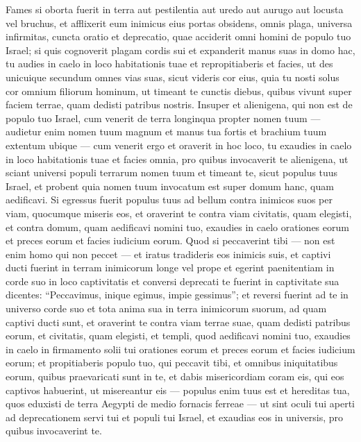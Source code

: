 \begin{biblechapter}
\begin{biblechapter}
\begin{biblechapter}
\begin{biblechapter}
\begin{biblechapter}
\begin{biblechapter}
\begin{biblechapter}
\begin{biblechapter}
 \verse Fames si oborta fuerit in terra aut pestilentia aut uredo aut aurugo aut locusta vel bruchus, et afflixerit eum inimicus eius portas obsidens, omnis plaga, universa infirmitas, 
\verse cuncta oratio et deprecatio, quae acciderit omni homini de populo tuo Israel; si quis cognoverit plagam cordis sui et expanderit manus suas in domo hac, 
\verse tu audies in caelo in loco habitationis tuae et repropitiaberis et facies, ut des unicuique secundum omnes vias suas, sicut videris cor eius, quia tu nosti solus cor omnium filiorum hominum, 
\verse ut timeant te cunctis diebus, quibus vivunt super faciem terrae, quam dedisti patribus nostris.
 \verse Insuper et alienigena, qui non est de populo tuo Israel, cum venerit de terra longinqua propter nomen tuum 
\verse — audietur enim nomen tuum magnum et manus tua fortis et brachium tuum extentum ubique — cum venerit ergo et oraverit in hoc loco, 
\verse tu exaudies in caelo in loco habitationis tuae et facies omnia, pro quibus invocaverit te alienigena, ut sciant universi populi terrarum nomen tuum et timeant te, sicut populus tuus Israel, et probent quia nomen tuum invocatum est super domum hanc, quam aedificavi.
 \verse Si egressus fuerit populus tuus ad bellum contra inimicos suos per viam, quocumque miseris eos, et oraverint te contra viam civitatis, quam elegisti, et contra domum, quam aedificavi nomini tuo, 
\verse exaudies in caelo orationes eorum et preces eorum et facies iudicium eorum.
 \verse Quod si peccaverint tibi — non est enim homo qui non peccet — et iratus tradideris eos inimicis suis, et captivi ducti fuerint in terram inimicorum longe vel prope 
\verse et egerint paenitentiam in corde suo in loco captivitatis et conversi deprecati te fuerint in captivitate sua dicentes: “Peccavimus, inique egimus, impie gessimus”; 
\verse et reversi fuerint ad te in universo corde suo et tota anima sua in terra inimicorum suorum, ad quam captivi ducti sunt, et oraverint te contra viam terrae suae, quam dedisti patribus eorum, et civitatis, quam elegisti, et templi, quod aedificavi nomini tuo, 
\verse exaudies in caelo in firmamento solii tui orationes eorum et preces eorum et facies iudicium eorum; 
\verse et propitiaberis populo tuo, qui peccavit tibi, et omnibus iniquitatibus eorum, quibus praevaricati sunt in te, et dabis misericordiam coram eis, qui eos captivos habuerint, ut misereantur eis 
\verse — populus enim tuus est et hereditas tua, quos eduxisti de terra Aegypti de medio fornacis ferreae — 
\verse ut sint oculi tui aperti ad deprecationem servi tui et populi tui Israel, et exaudias eos in universis, pro quibus invocaverint te. 

\end{biblechapter}
\end{biblechapter}
\end{biblechapter}
\end{biblechapter}
\end{biblechapter}
\end{biblechapter}
\end{biblechapter}
\end{biblechapter}
